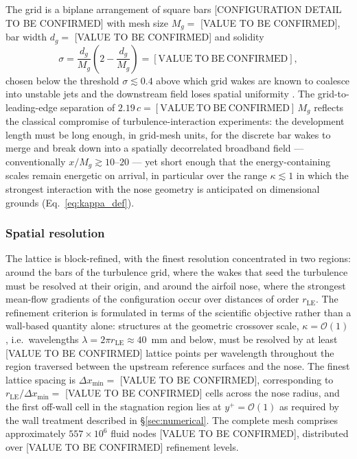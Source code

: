 \documentclass[lineno]{JFM-FLM_Au}
\begin{document}
The grid is a biplane arrangement of square bars
[CONFIGURATION DETAIL TO BE CONFIRMED] with mesh size
$M_g = $ [VALUE TO BE CONFIRMED], bar width
$d_g = $ [VALUE TO BE CONFIRMED] and solidity
\begin{equation}
  \sigma = \frac{d_g}{M_g}\left(2 - \frac{d_g}{M_g}\right)
         = [\mathrm{VALUE~TO~BE~CONFIRMED}],
  \label{eq:solidity}
\end{equation}
chosen below the threshold $\sigma \lesssim 0.4$ above which grid wakes
are known to coalesce into unstable jets and the downstream field loses
spatial uniformity \citep{Corrsin1963}. The grid-to-leading-edge
separation of $2.19\,c = [\mathrm{VALUE~TO~BE~CONFIRMED}]\,M_g$ reflects
the classical compromise of turbulence-interaction experiments: the
development length must be long enough, in grid-mesh units, for the
discrete bar wakes to merge and break down into a spatially
decorrelated broadband field --- conventionally
$x/M_g \gtrsim 10$--$20$ \citep{ComteBellotCorrsin1971} --- yet short
enough that the energy-containing scales remain energetic on arrival,
in particular over the range $\kappa \lesssim 1$ in which the strongest
interaction with the nose geometry is anticipated on dimensional
grounds (Eq.~\ref{eq:kappa_def}).

\subsubsection{Spatial resolution}

The lattice is block-refined, with the finest resolution concentrated in
two regions: around the bars of the turbulence grid, where the wakes
that seed the turbulence must be resolved at their origin, and around
the airfoil nose, where the strongest mean-flow gradients of the
configuration occur over distances of order $r_{\mathrm{LE}}$. The
refinement criterion is formulated in terms of the scientific objective
rather than a wall-based quantity alone: structures at the geometric
crossover scale, $\kappa = \mathcal{O}(1)$, i.e.\ wavelengths
$\lambda = 2\pi r_{\mathrm{LE}} \approx 40$~mm and below, must be
resolved by at least [VALUE TO BE CONFIRMED] lattice points per
wavelength throughout the region traversed between the upstream
reference surfaces and the nose. The finest lattice spacing is
$\Delta x_{\min} = $ [VALUE TO BE CONFIRMED], corresponding to
$r_{\mathrm{LE}}/\Delta x_{\min} = $ [VALUE TO BE CONFIRMED] cells
across the nose radius, and the first off-wall cell in the stagnation
region lies at $y^{+} = \mathcal{O}(1)$ as required by the wall
treatment described in \S\ref{sec:numerical}. The complete mesh
comprises approximately $557\times10^{6}$ fluid nodes
[VALUE TO BE CONFIRMED], distributed over
[VALUE TO BE CONFIRMED] refinement levels.
\end{document}
